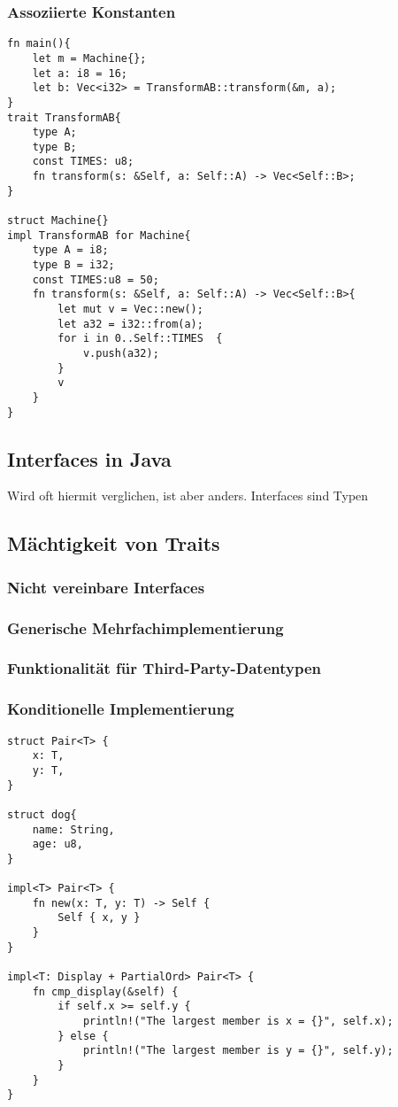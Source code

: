 \documentclass[a4paper, 1ppt]{article}
\begin{document}
\subsubsection{Assoziierte Konstanten}
\begin{verbatim}
fn main(){
    let m = Machine{};
    let a: i8 = 16;
    let b: Vec<i32> = TransformAB::transform(&m, a);
}
trait TransformAB{
    type A;
    type B;
    const TIMES: u8;
    fn transform(s: &Self, a: Self::A) -> Vec<Self::B>;
}

struct Machine{}
impl TransformAB for Machine{
    type A = i8;
    type B = i32;
    const TIMES:u8 = 50;
    fn transform(s: &Self, a: Self::A) -> Vec<Self::B>{
        let mut v = Vec::new();
        let a32 = i32::from(a);
        for i in 0..Self::TIMES  {
            v.push(a32);
        }
        v
    }
}
\end{verbatim}
\subsection{Interfaces in Java}
Wird oft hiermit verglichen, ist aber anders.
Interfaces sind Typen
\subsection{Mächtigkeit von Traits}
\subsubsection{Nicht vereinbare Interfaces}
\subsubsection{Generische Mehrfachimplementierung}
\subsubsection{Funktionalität für Third-Party-Datentypen}
\subsubsection{Konditionelle Implementierung}
\begin{verbatim}
struct Pair<T> {
    x: T,
    y: T,
}

struct dog{
    name: String,
    age: u8,
}

impl<T> Pair<T> {
    fn new(x: T, y: T) -> Self {
        Self { x, y }
    }
}

impl<T: Display + PartialOrd> Pair<T> {
    fn cmp_display(&self) {
        if self.x >= self.y {
            println!("The largest member is x = {}", self.x);
        } else {
            println!("The largest member is y = {}", self.y);
        }
    }
}
\end{verbatim}
\end{document}
